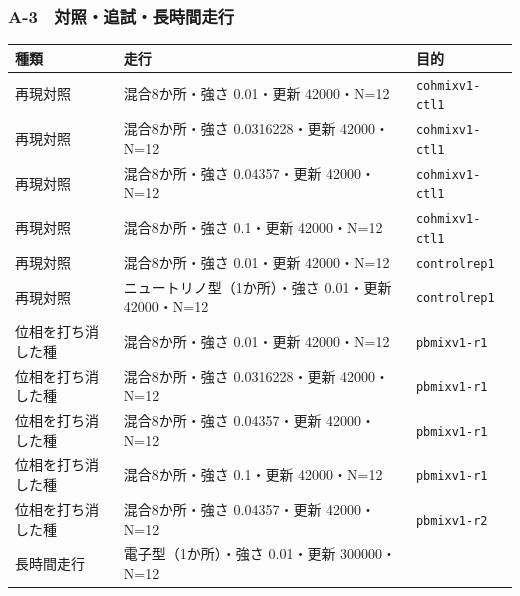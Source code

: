 \documentclass[
]{ltjsarticle}
\newcounter{none} %
\begin{document}
\subsubsection{A-3　対照・追試・長時間走行}\label{a-3-ux5bfeux7167ux8ffdux8a66ux9577ux6642ux9593ux8d70ux884c}

{\def\LTcaptype{none} %
\begin{longtable}[]{@{}
  >{\raggedright\arraybackslash}p{}
  >{\raggedright\arraybackslash}p{}
  >{\raggedright\arraybackslash}p{}@{}}
\toprule\noalign{}
\begin{minipage}[b]{\linewidth}\raggedright
種類
\end{minipage} & \begin{minipage}[b]{\linewidth}\raggedright
走行
\end{minipage} & \begin{minipage}[b]{\linewidth}\raggedright
目的
\end{minipage} \\
\midrule\noalign{}
\endhead
\bottomrule\noalign{}
\endlastfoot
再現対照 & 混合8か所・強さ 0.01・更新 42000・N=12 &
\texttt{cohmixv1-ctl1} \\
再現対照 & 混合8か所・強さ 0.0316228・更新 42000・N=12 &
\texttt{cohmixv1-ctl1} \\
再現対照 & 混合8か所・強さ 0.04357・更新 42000・N=12 &
\texttt{cohmixv1-ctl1} \\
再現対照 & 混合8か所・強さ 0.1・更新 42000・N=12 &
\texttt{cohmixv1-ctl1} \\
再現対照 & 混合8か所・強さ 0.01・更新 42000・N=12 &
\texttt{controlrep1} \\
再現対照 & ニュートリノ型（1か所）・強さ 0.01・更新 42000・N=12 &
\texttt{controlrep1} \\
位相を打ち消した種 & 混合8か所・強さ 0.01・更新 42000・N=12 &
\texttt{pbmixv1-r1} \\
位相を打ち消した種 & 混合8か所・強さ 0.0316228・更新 42000・N=12 &
\texttt{pbmixv1-r1} \\
位相を打ち消した種 & 混合8か所・強さ 0.04357・更新 42000・N=12 &
\texttt{pbmixv1-r1} \\
位相を打ち消した種 & 混合8か所・強さ 0.1・更新 42000・N=12 &
\texttt{pbmixv1-r1} \\
位相を打ち消した種 & 混合8か所・強さ 0.04357・更新 42000・N=12 &
\texttt{pbmixv1-r2} \\
長時間走行 & 電子型（1か所）・強さ 0.01・更新 300000・N=12 &

\end{longtable}}
\end{document}

